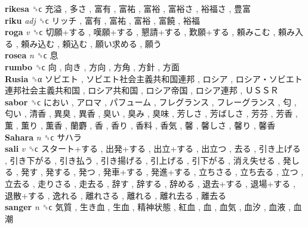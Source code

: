 \textbf{rikesa} ␝ϲ   充溢 ,  多さ ,  富有 ,  富祐 ,  富裕 ,  富裕さ ,  裕福さ ,  豊富   \\
\textbf{riku} \emph{adj}  ␝ϲ   リッチ ,  富有 ,  富祐 ,  富裕 ,  富饒 ,  裕福   \\
\textbf{roga} \emph{v}  ␝ϲ   切願+する ,  嘆願+する ,  懇請+する ,  歎願+する ,  頼みこむ ,  頼み入る ,  頼み込む ,  頼込む ,  願い求める ,  願う   \\
\textbf{rosea} \emph{n}  ␝ϲ   息   \\
\textbf{rumbo} ␝ϲ   向 ,  向き ,  方向 ,  方角 ,  方針 ,  方面   \\
\textbf{Rusia} ␝α   ソビエト ,  ソビエト社会主義共和国連邦 ,  ロシア ,  ロシア・ソビエト連邦社会主義共和国 ,  ロシア共和国 ,  ロシア帝国 ,  ロシア連邦 ,  ＵＳＳＲ   \\
\textbf{sabor} ␝ϲ   におい ,  アロマ ,  パフューム ,  フレグランス ,  フレーグランス ,  匂 ,  匂い ,  清香 ,  異臭 ,  異香 ,  臭い ,  臭み ,  臭味 ,  芳しさ ,  芳ばしさ ,  芳芬 ,  芳香 ,  薫 ,  薫り ,  薫香 ,  蘭麝 ,  香 ,  香り ,  香料 ,  香気 ,  馨 ,  馨しさ ,  馨り ,  馨香   \\
\textbf{Sahara} \emph{n}  ␝ϲ   サハラ   \\
\textbf{sali} \emph{v}  ␝ϲ   スタート+する ,  出発+する ,  出立+する ,  出立つ ,  去る ,  引き上げる ,  引き下がる ,  引き払う ,  引き揚げる ,  引上げる ,  引下がる ,  消え失せる ,  発しる ,  発す ,  発する ,  発つ ,  発車+する ,  発進+する ,  立ちさる ,  立ち去る ,  立つ ,  立去る ,  走りさる ,  走去る ,  辞す ,  辞する ,  辞める ,  退去+する ,  退場+する ,  退散+する ,  逸れる ,  離れさる ,  離れる ,  離れ去る ,  離去る   \\
\textbf{sanger} \emph{n}  ␝ϲ   気質 ,  生き血 ,  生血 ,  精神状態 ,  紅血 ,  血 ,  血気 ,  血汐 ,  血液 ,  血潮   \\
